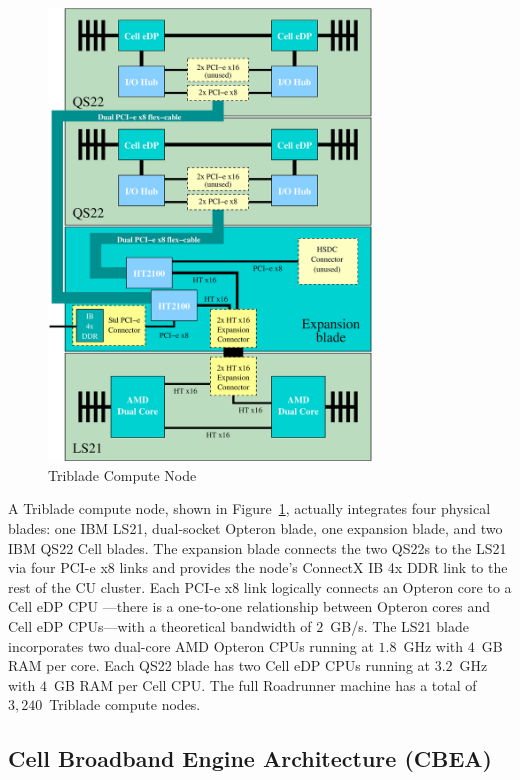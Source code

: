 \documentclass[journal,twoside]{IEEEtran}
\newcommand{\fig}[1]{Figure~\ref{fig:#1}}
\begin{document}
\begin{figure}
\begin{center}
\includegraphics[width=3.375in]{figs/triblade.eps}
\caption{Triblade Compute Node}
\label{fig:triblade}
\end{center}
\end{figure}

A Triblade compute node, shown in \fig{triblade}, actually integrates
four physical blades: one IBM LS21, dual-socket Opteron blade, one
expansion blade, and two IBM QS22 Cell blades.  The expansion blade
connects the two QS22s to the LS21 via four PCI-e x8 links and
provides the node's ConnectX IB 4x DDR link to the rest of the CU
cluster.  Each PCI-e x8 link logically connects an Opteron core to a
Cell eDP CPU ---there is a one-to-one relationship between Opteron
cores and Cell eDP CPUs---with a theoretical bandwidth of $2$~GB/s.
The LS21 blade incorporates two dual-core AMD Opteron CPUs running at
$1.8$~GHz with $4$~GB RAM per core.  Each QS22 blade has two Cell eDP
CPUs running at $3.2$~GHz with $4$~GB RAM per Cell CPU.  The full
Roadrunner machine has a total of $3,240$~Triblade compute nodes.

\subsection{Cell Broadband Engine Architecture (CBEA)}

\end{document}
